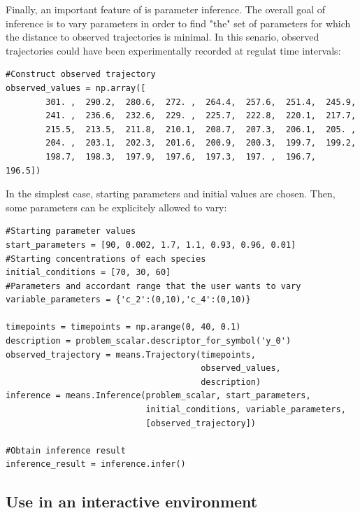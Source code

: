Finally, an important feature of \means{} is parameter inference.
The overall goal of inference is to vary parameters in order to find "the" set of parameters for which the distance to observed trajectories is minimal.
In this senario, observed trajectories could have been experimentally recorded at regulat time intervals:

\begin{framed}
\begin{verbatim}
#Construct observed trajectory
observed_values = np.array([ 
        301. ,  290.2,  280.6,  272. ,  264.4,  257.6,  251.4,  245.9,
        241. ,  236.6,  232.6,  229. ,  225.7,  222.8,  220.1,  217.7,
        215.5,  213.5,  211.8,  210.1,  208.7,  207.3,  206.1,  205. ,
        204. ,  203.1,  202.3,  201.6,  200.9,  200.3,  199.7,  199.2,
        198.7,  198.3,  197.9,  197.6,  197.3,  197. ,  196.7,  196.5])

\end{verbatim}
\end{framed}

In the simplest case, starting parameters and initial values are chosen.
Then, some parameters can be explicitely allowed to vary:

\begin{framed}
\begin{verbatim}
#Starting parameter values
start_parameters = [90, 0.002, 1.7, 1.1, 0.93, 0.96, 0.01]
#Starting concentrations of each species
initial_conditions = [70, 30, 60]
#Parameters and accordant range that the user wants to vary
variable_parameters = {'c_2':(0,10),'c_4':(0,10)}
        
timepoints = timepoints = np.arange(0, 40, 0.1)
description = problem_scalar.descriptor_for_symbol('y_0')
observed_trajectory = means.Trajectory(timepoints,
                                       observed_values,
                                       description)
inference = means.Inference(problem_scalar, start_parameters, 
                            initial_conditions, variable_parameters, 
                            [observed_trajectory])

#Obtain inference result
inference_result = inference.infer()
\end{verbatim}
\end{framed}

\subsection{Use in an interactive environment}


